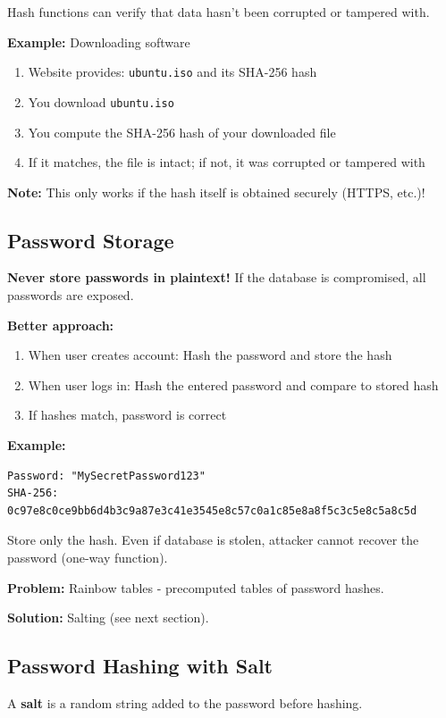 \documentclass[11pt,a4paper]{report}
\begin{document}
Hash functions can verify that data hasn't been corrupted or tampered with.

\textbf{Example:} Downloading software
\begin{enumerate}
\item Website provides: \verb|ubuntu.iso| and its SHA-256 hash
\item You download \verb|ubuntu.iso|
\item You compute the SHA-256 hash of your downloaded file
\item If it matches, the file is intact; if not, it was corrupted or tampered with
\end{enumerate}

\textbf{Note:} This only works if the hash itself is obtained securely (HTTPS, etc.)!

\subsection{Password Storage}

\textbf{Never store passwords in plaintext!} If the database is compromised, all passwords are exposed.

\textbf{Better approach:}
\begin{enumerate}
\item When user creates account: Hash the password and store the hash
\item When user logs in: Hash the entered password and compare to stored hash
\item If hashes match, password is correct
\end{enumerate}

\textbf{Example:}
\begin{verbatim}
Password: "MySecretPassword123"
SHA-256: 0c97e8c0ce9bb6d4b3c9a87e3c41e3545e8c57c0a1c85e8a8f5c3c5e8c5a8c5d
\end{verbatim}

Store only the hash. Even if database is stolen, attacker cannot recover the password (one-way function).

\textbf{Problem:} Rainbow tables - precomputed tables of password hashes.

\textbf{Solution:} Salting (see next section).

\subsection{Password Hashing with Salt}

A \textbf{salt} is a random string added to the password before hashing.
\end{document}

